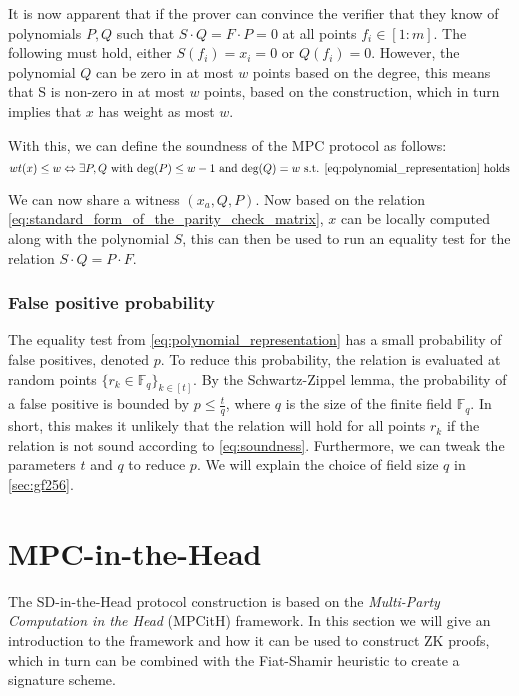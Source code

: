 \documentclass[twoside,11pt,openright]{report}
\theoremstyle{definition}
\theoremstyle{plain}
\begin{document}
It is now apparent that if the prover can convince the verifier that they know of polynomials $P,Q$ such that $S\cdot Q = F \cdot P = 0$ at all points $f_i \in [1:m]$. The following must hold, either $S(f_i) = x_i = 0$ or $Q(f_i) = 0$. However, the polynomial $Q$ can be zero in at most $w$ points based on the degree, this means that S is non-zero in at most $w$ points, based on the construction, which in turn implies that $x$ has weight as most $w$.

With this, we can define the soundness of the MPC protocol as follows:
\begin{equation}
  wt(x) \leq w \Leftrightarrow \exists P,Q \text{  with  }\text{deg}(P)\leq w-1\text{  and  }\text{deg}(Q) = w\text{ s.t. \autoref{eq:polynomial_representation} holds}
  \label{eq:soundness}
\end{equation}

We can now share a witness $(x_a, Q, P)$. Now based on the relation \autoref{eq:standard_form_of_the_parity_check_matrix}, $x$ can be locally computed along with the polynomial $S$, this can then be used to run an equality test for the relation $S \cdot Q = P \cdot F$.

\subsubsection{False positive probability}\label{sub:equality_test}
The equality test from \autoref{eq:polynomial_representation} has a small probability of false positives, denoted $p$. To reduce this probability, the relation is evaluated at random points $\{r_k \in \mathbb{F}_q\}_{k\in[t]}$. By the Schwartz-Zippel lemma, the probability of a false positive is bounded by $p \leq \frac{t}{q}$, where $q$ is the size of the finite field $\mathbb{F}_q$. In short, this makes it unlikely that the relation will hold for all points $r_k$ if the relation is not sound according to \autoref{eq:soundness}. Furthermore, we can tweak the parameters $t$ and $q$ to reduce $p$. We will explain the choice of field size $q$ in \autoref{sec:gf256}.

\section{MPC-in-the-Head}\label{sec:mpcinth}

The SD-in-the-Head protocol construction is based on the \textit{Multi-Party Computation in the Head} (MPCitH) framework. In this section we will give an introduction to the framework and how it can be used to construct ZK proofs, which in turn can be combined with the Fiat-Shamir heuristic to create a signature scheme.
\end{document}
